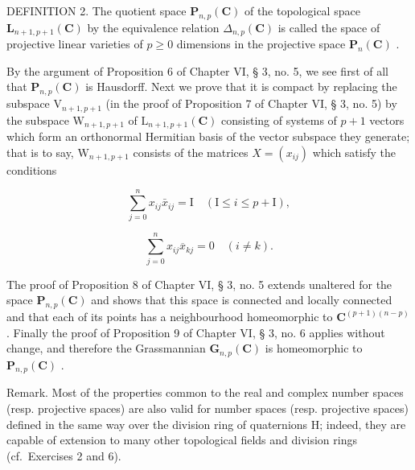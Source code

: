 DEFINITION 2. The quotient space \(\mathbf{P}_{n,p}(\mathbf{C})\) of the topological space \(\mathbf{L}_{n+1, p+1}(\mathbf{C})\) by the equivalence relation \(\Delta_{n,p}(\mathbf{C})\) is called the space of projective linear varieties of \(p \geqslant 0\) dimensions in the projective space \(\mathbf{P}_n(\mathbf{C})\) .

By the argument of Proposition 6 of Chapter VI, § 3, no. 5, we see first of all that \(\mathbf{P}_{n,p}(\mathbf{C})\) is Hausdorff. Next we prove that it is compact by replacing the subspace \(\mathrm{V}_{n+1,p+1}\) (in the proof of Proposition 7 of Chapter VI, § 3, no. 5) by the subspace \(\mathrm{W}_{n+1,p+1}\) of \(\mathrm{L}_{n+1,p+1}(\mathbf{C})\) consisting of systems of \(p+1\) vectors which form an orthonormal Hermitian basis of the vector subspace they generate; that is to say, \(\mathrm{W}_{n+1,p+1}\) consists of the matrices \(X=(x_{ij})\) which satisfy the conditions

\[
\sum_ {j = 0} ^ {n} x _ {i j} \bar {x} _ {i j} = \mathrm{I} \quad (\mathrm{I} \leqslant i \leqslant p + \mathrm{I}),
\]

\[
\sum_ {j = 0} ^ {n} x _ {i j} \overline {{{x}}} _ {k j} = 0 \quad (i \neq k).
\]

The proof of Proposition 8 of Chapter VI, § 3, no. 5 extends unaltered for the space \(\mathbf{P}_{n,p}(\mathbf{C})\) and shows that this space is connected and locally connected and that each of its points has a neighbourhood homeomorphic to \(\mathbf{C}^{(p+1)(n-p)}\) . Finally the proof of Proposition 9 of Chapter VI, § 3, no. 6 applies without change, and therefore the Grassmannian \(\mathbf{G}_{n,p}(\mathbf{C})\) is homeomorphic to \(\mathbf{P}_{n,p}(\mathbf{C})\) .

Remark. Most of the properties common to the real and complex number spaces (resp. projective spaces) are also valid for number spaces (resp. projective spaces) defined in the same way over the division ring of quaternions H; indeed, they are capable of extension to many other topological fields and division rings (cf.~Exercises 2 and 6).

\ExerciseGroupsStart

